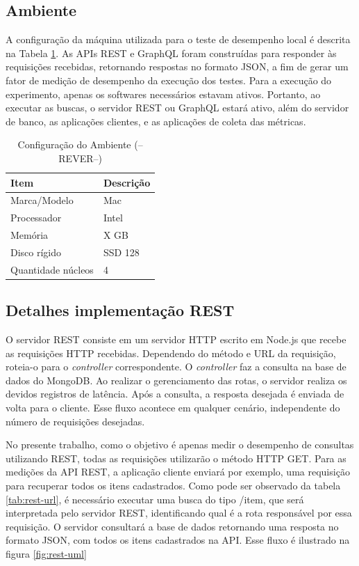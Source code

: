 \subsection{Ambiente}

A configuração da máquina utilizada para o teste de desempenho local é descrita na Tabela \ref{tab:host}. As APIs REST e GraphQL foram construídas para responder às requisições recebidas, retornando respostas no formato JSON, a fim de gerar um fator de medição de desempenho da execução dos testes. Para a execução do experimento, apenas os softwares necessários estavam ativos. Portanto, ao executar as buscas, o servidor REST ou GraphQL estará ativo, além do servidor de banco, as aplicações clientes, e as aplicações de coleta das métricas.

\begin{table}[htbp]
    \centering
    \begin{tabular}{| l | l |}
        \hline
        \textbf{Item} & \textbf{Descrição} \\ \hline
        Marca/Modelo & Mac \\ \hline
        Processador & Intel \\ \hline
        Memória &  X GB  \\ \hline
        Disco rígido & SSD 128  \\ \hline
        Quantidade núcleos & 4  \\ \hline
    \end{tabular}
    \caption{Configuração do Ambiente (--REVER--)} \label{tab:host}
\end{table}

\subsection{Detalhes implementação REST}

O servidor REST consiste em um servidor HTTP escrito em Node.js que recebe as requisições HTTP recebidas. Dependendo do método e URL da requisição, roteia-o para o \textit{controller} correspondente. O \textit{controller} faz a consulta na base de dados do MongoDB. Ao realizar o gerenciamento das rotas, o servidor realiza os devidos registros de latência. Após a consulta, a resposta desejada é enviada de volta para o cliente. Esse fluxo acontece em qualquer cenário, independente do número de requisições desejadas.

No presente trabalho, como o objetivo é apenas medir o desempenho de consultas utilizando REST, todas as requisições utilizarão o método HTTP GET. Para as medições da API REST, a aplicação cliente enviará por exemplo, uma requisição para recuperar todos os itens cadastrados. Como pode ser observado da tabela \ref{tab:rest-url}, é necessário executar uma busca do tipo \textup{/item}, que será interpretada pelo servidor REST, identificando qual é a rota responsável por essa requisição. O servidor consultará a base de dados retornando uma resposta no formato JSON, com todos os itens cadastrados na API. Esse fluxo é ilustrado na figura \ref{fig:rest-uml}

